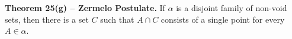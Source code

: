 \textbf{Theorem 25(g) -- Zermelo Postulate.} If $\alpha$ is a disjoint family of non-void sets, then there is a set $C$ such that $A \cap C$ consists of a single point for every $A \in \alpha$.
